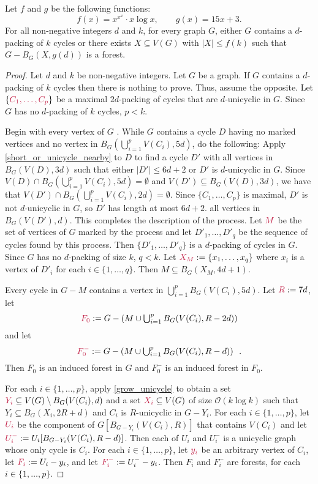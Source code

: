 \documentclass{patmorin}
\newcommand{\Oh}{\mathcal{O}}
\DeclarePairedDelimiter\set{\{}{\}}
\begin{document}
\begin{thm}\label{thm:the-big-ball-of-wax}
  Let $f$ and $g$ be the following functions:
  \[
    f(x)= x^{x^x}\cdot x\log x,\qquad
    g(x)= 15x +3.
  \]
  For all non-negative integers $d$ and $k$, for every graph $G$, either $G$ contains a $d$-packing of $k$ cycles or there exists $X\subseteq V(G)$ with $|X|\leq f(k)$ such that $G-B_G(X,g(d))$ is a forest.
\end{thm}

\begin{proof}
  Let $d$ and $k$ be non-negative integers. Let $G$ be a graph. If $G$ contains a $d$-packing of $k$ cycles then there is nothing to prove. Thus, assume the opposite. Let $\set{\mathdefin{C_1,\ldots,C_p}}$ be a maximal $2d$-packing of cycles that are $d$-unicyclic in $G$.  Since $G$ has no $d$-packing of $k$ cycles, $p<k$.

  Begin with every vertex of $G$ .  While $G$ contains a cycle $D$ having no marked vertices and no vertex in $B_G(\bigcup_{i=1}^p V(C_i),5d)$, do the following:  Apply \cref{short_or_unicycle_nearby} to $D$ to find a cycle $D'$ with all vertices in  $B_G(V(D),3d)$ such that either $|D'|\leq 6d+2$ or $D'$ is $d$-unicyclic in $G$. Since $V(D)\cap B_G(\bigcup_{i=1}^p V(C_i),5d)=\emptyset$ and $V(D')\subseteq B_G(V(D),3d)$, we have that $V(D')\cap B_G(\bigcup_{i=1}^p V(C_i),2d)=\emptyset$. Since $\{C_1,\ldots,C_p\}$ is maximal, $D'$ is not $d$-unicyclic in $G$, so $D'$ has length at most $6d+2$.   all vertices in $B_G(V(D'),d)$. This completes the description of the process.  Let $\mathdefin{M}$ be the set of vertices of $G$ marked by the process and let $D'_1,\ldots,D'_{q}$ be the sequence of cycles found by this process. Then $\{D'_1,\ldots,D'_q\}$ is a $d$-packing of cycles in $G$.  Since $G$ has no $d$-packing of size $k$, $q<k$. Let $\mathdefin{X_M}:=\{x_1,\ldots,x_{q}\}$ where  $x_i$ is a vertex of $D'_i$ for each $i\in\{1,\ldots,q\}$. Then $M\subseteq B_G(X_M,4d+1)$.

Every cycle in $G-M$ contains a vertex in $\bigcup_{i=1}^p B_G(V(C_i),5d)$.
Let $\mathdefin{R}:=7d$,
let
\[
  \textstyle\mathdefin{F_0}:=G-\left(M\cup \bigcup_{i=1}^p B_G(V(C_i),R-2d)\right)
\]
and let
\[
  \textstyle\mathdefin{F^-_0}:=G-\left(M\cup \bigcup_{i=1}^p B_G(V(C_i),R-d)\right) \enspace .
\]
Then $F_0$ is an induced forest in $G$ and $F^-_0$  is an induced forest in $F_0$.

For each $i\in\{1,\ldots,p\}$, apply \cref{grow_unicycle} to obtain a set $\mathdefin{Y_i}\subseteq V(G)\setminus B_G(V(C_i),d)$ and a set $\mathdefin{X_i}\subseteq V(G)$ of size $\Oh(k\log k)$ such that $Y_i\subseteq B_G(X_i,2R+d)$ and $C_i$ is $R$-unicyclic in $G-Y_i$.  For each $i\in\{1,\ldots,p\}$, let $\mathdefin{U_i}$ be the component of $G[B_{G-Y_i}(V(C_i),R)]$ that contains $V(C_i)$ and let $\mathdefin{U_i^-}:=U_i[B_{G-Y_i}(V(C_i),R-d)]$.  Then each of $U_i$ and $U^-_i$ is a unicyclic graph whose only cycle is $C_i$.   For each $i\in\{1,\ldots,p\}$, let $\mathdefin{y_i}$ be an arbitrary vertex of $C_i$, let $\mathdefin{F_i}:=U_i-y_i$, and let $\mathdefin{F^-_i}:=U^-_i-y_i$. Then $F_i$ and $F_i^-$ are forests, for each $i\in\{1,\ldots,p\}$.


\end{proof}
\end{document}
